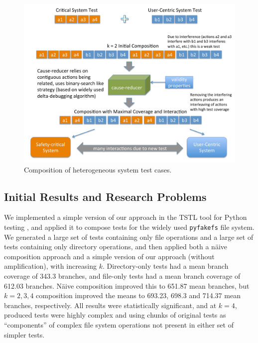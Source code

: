 \begin{figure}
\centering
\includegraphics[width=0.6\columnwidth]{testcomp}
\caption{Composition of heterogeneous system test cases.}
\label{fig:compose}
\end{figure}



\subsection{Initial Results and Research Problems}

We implemented a simple version of our approach in the TSTL tool for
Python testing \cite{NFM15}, and applied
it to compose tests for the widely used {\tt pyfakefs} file system.  We generated a
large set of tests containing only file operations and a large set of
tests containing only directory operations, and then applied both a
n\"aive composition approach and a simple version of our approach
(without amplification), with increasing $k$.  Directory-only tests
had a mean branch coverage of 343.3 branches, and file-only tests had
a mean branch coverage of 612.03 branches.  N\"aive composition
improved this to 651.87 mean branches, but $k=2, 3, 4$ composition improved
the means to 693.23, 698.3 and 714.37 mean branches, respectively.
All results were statistically significant, and at $k=4$, produced
tests were highly complex and using chunks of original tests as
``components'' of complex file system operations not present in either
set of simpler tests.

